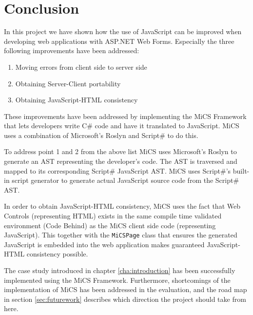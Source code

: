 \chapter{Conclusion}
In this project we have shown how the use of JavaScript can be improved when developing web applications with ASP.NET Web Forms. Especially the three following improvements have been addressed:

\begin{enumerate}
	\item Moving errors from client side to server side
	\item Obtaining Server-Client portability
	\item Obtaining JavaScript-HTML consistency
\end{enumerate}

These improvements have been addressed by implementing the MiCS Framework that lets developers write C\# code and have it translated to JavaScript. MiCS uses a combination of Microsoft's Roslyn and Script\# to do this. 

To address point 1 and 2 from the above list MiCS uses Microsoft's Roslyn to generate an AST representing the developer's code. The AST is traversed and mapped to its corresponding Script\# JavaScript AST. MiCS uses Script\#'s built-in script generator to generate actual JavaScript source code from the Script\# AST. 

In order to obtain JavaScript-HTML consistency, MiCS uses the fact that Web Controls (representing HTML) exists in the same compile time validated environment (Code Behind) as the MiCS client side code (representing JavaScript). This together with the \texttt{MiCSPage} class that ensures the generated JavaScript is embedded into the web application makes guaranteed JavaScript-HTML consistency possible.

The case study introduced in chapter \ref{cha:introduction} has been successfully implemented using the MiCS Framework. Furthermore, shortcomings of the implementation of MiCS has been addressed in the evaluation, and the road map in section \ref{sec:futurework} describes which direction the project should take from here.
